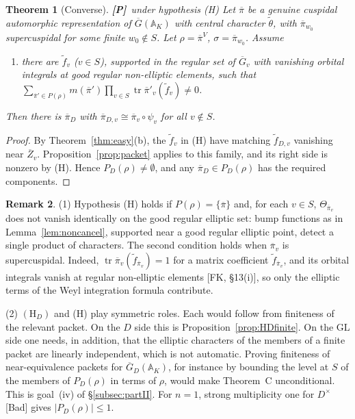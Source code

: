 \documentclass[12pt]{article}
\newcommand{\ov}[1]{\overline{#1}}
\newcommand{\A}{\mathbb{A}}
\newcommand{\tr}{\operatorname{tr}}
\newcommand{\GL}{\mathrm{GL}}
\newcommand{\Gb}{\ov{G}}
\newcommand{\Zb}{\ov{Z}}
\newcommand{\GDb}{\ov{G}_D}
\newcommand{\pib}{\ov{\pi}}
\newcommand{\Pv}{\textbf{[P]}}
\theoremstyle{plain}
\newtheorem{theorem}{Theorem}[section]
\theoremstyle{definition}
\newtheorem{remark}[theorem]{Remark}
\begin{document}
\begin{theorem}[Converse]\label{thm:converse}\Pv\ under hypothesis (H)
Let $\pib$ be a genuine cuspidal automorphic representation of $\Gb(\A_K)$ with central character $\tilde\theta$, with $\pib_{w_0}$ supercuspidal for some finite $w_0\notin S$. Let $\rho=\pib^V$, $\sigma=\pib_{w_0}$. Assume
\begin{enumerate}[label=(H)]
\item there are $\tilde f_v$ ($v\in S$), supported in the regular set of $\Gb_v$ with vanishing orbital integrals at good regular non-elliptic elements, such that $\sum_{\pib'\in P(\rho)}m(\pib')\prod_{v\in S}\tr\pib'_v(\tilde f_v)\ne0$.
\end{enumerate}
Then there is $\pib_D$ with $\pib_{D,v}\cong\pib_v\circ\psi_v$ for all $v\notin S$.
\end{theorem}
\begin{proof}
By Theorem~\ref{thm:easy}(b), the $\tilde f_v$ in (H) have matching $\tilde f_{D,v}$ vanishing near $\Zb_v$. Proposition~\ref{prop:packet} applies to this family, and its right side is nonzero by (H). Hence $P_D(\rho)\ne\emptyset$, and any $\pib_D\in P_D(\rho)$ has the required components.
\end{proof}

\begin{remark}\label{rem:H}
(1) Hypothesis (H) holds if $P(\rho)=\{\pib\}$ and, for each $v\in S$, $\Theta_{\pib_v}$ does not vanish identically on the good regular elliptic set: bump functions as in Lemma~\ref{lem:noncancel}, supported near a good regular elliptic point, detect a single product of characters. The second condition holds when $\pib_v$ is supercuspidal. Indeed, $\tr\pib_v(\tilde f_{\pib_v})=1$ for a matrix coefficient $\tilde f_{\pib_v}$, and its orbital integrals vanish at regular non-elliptic elements [FK, \S13(i)], so only the elliptic terms of the Weyl integration formula contribute.

(2) $(\mathrm H_D)$ and (H) play symmetric roles. Each would follow from finiteness of the relevant packet. On the $D$ side this is Proposition~\ref{prop:HDfinite}. On the $\GL$ side one needs, in addition, that the elliptic characters of the members of a finite packet are linearly independent, which is not automatic. Proving finiteness of near-equivalence packets for $\GDb(\A_K)$, for instance by bounding the level at $S$ of the members of $P_D(\rho)$ in terms of $\rho$, would make Theorem~C unconditional. This is goal~(iv) of \S\ref{subsec:partII}. For $n=1$, strong multiplicity one for $D^\times$ [Bad] gives $|P_D(\rho)|\le1$.
\end{remark}
\end{document}
